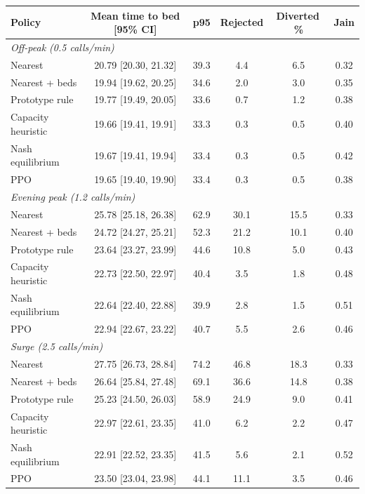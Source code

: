 \begin{tabular}{lccccc}
\toprule
Policy & Mean time to bed [95\% CI] & p95 & Rejected & Diverted\,\% & Jain \\
\midrule
\multicolumn{6}{l}{\textit{Off-peak (0.5 calls/min)}} \\
Nearest & 20.79 [20.30, 21.32] & 39.3 & 4.4 & 6.5 & 0.32 \\
Nearest + beds & 19.94 [19.62, 20.25] & 34.6 & 2.0 & 3.0 & 0.35 \\
Prototype rule & 19.77 [19.49, 20.05] & 33.6 & 0.7 & 1.2 & 0.38 \\
Capacity heuristic & 19.66 [19.41, 19.91] & 33.3 & 0.3 & 0.5 & 0.40 \\
Nash equilibrium & 19.67 [19.41, 19.94] & 33.4 & 0.3 & 0.5 & 0.42 \\
PPO & 19.65 [19.40, 19.90] & 33.4 & 0.3 & 0.5 & 0.38 \\
\midrule
\multicolumn{6}{l}{\textit{Evening peak (1.2 calls/min)}} \\
Nearest & 25.78 [25.18, 26.38] & 62.9 & 30.1 & 15.5 & 0.33 \\
Nearest + beds & 24.72 [24.27, 25.21] & 52.3 & 21.2 & 10.1 & 0.40 \\
Prototype rule & 23.64 [23.27, 23.99] & 44.6 & 10.8 & 5.0 & 0.43 \\
Capacity heuristic & 22.73 [22.50, 22.97] & 40.4 & 3.5 & 1.8 & 0.48 \\
Nash equilibrium & 22.64 [22.40, 22.88] & 39.9 & 2.8 & 1.5 & 0.51 \\
PPO & 22.94 [22.67, 23.22] & 40.7 & 5.5 & 2.6 & 0.46 \\
\midrule
\multicolumn{6}{l}{\textit{Surge (2.5 calls/min)}} \\
Nearest & 27.75 [26.73, 28.84] & 74.2 & 46.8 & 18.3 & 0.33 \\
Nearest + beds & 26.64 [25.84, 27.48] & 69.1 & 36.6 & 14.8 & 0.38 \\
Prototype rule & 25.23 [24.50, 26.03] & 58.9 & 24.9 & 9.0 & 0.41 \\
Capacity heuristic & 22.97 [22.61, 23.35] & 41.0 & 6.2 & 2.2 & 0.47 \\
Nash equilibrium & 22.91 [22.52, 23.35] & 41.5 & 5.6 & 2.1 & 0.52 \\
PPO & 23.50 [23.04, 23.98] & 44.1 & 11.1 & 3.5 & 0.46 \\
\bottomrule
\end{tabular}
